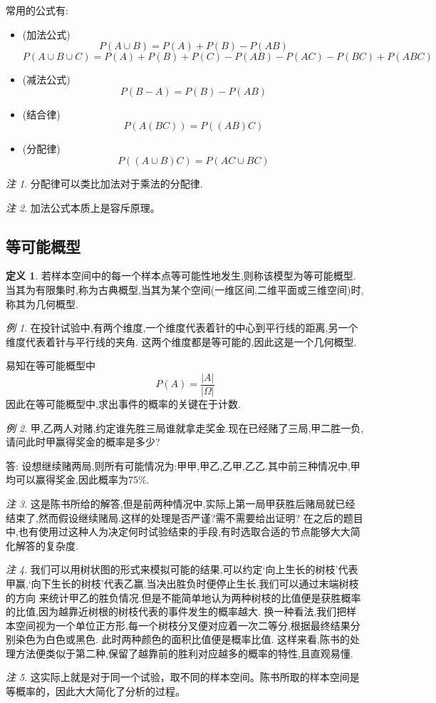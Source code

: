 \documentclass[a4paper,11pt]{article}%
\theoremstyle{remark}
\newtheorem*{remark}{注}
\theoremstyle{remark}
\newtheorem*{example}{例}
\theoremstyle{definition}
\theoremstyle{definition}
\newtheorem*{definition}{定义}
\theoremstyle{plain}
\newcommand*{\abs}[1]{\lvert #1 \rvert}
\begin{document}
常用的公式有:
\begin{itemize}
    \item (加法公式)
    \[P(A\cup B)=P(A)+P(B)-P(AB)\]
    \[P(A\cup B\cup C)=P(A)+P(B)+P(C)-P(AB)-P(AC)-P(BC)+P(ABC)\]
    \item (减法公式)
    \[P(B-A)=P(B)-P(AB)\]
    \item(结合律)
    \[P(A(BC))=P((AB)C)\]
    \item(分配律)
    \[P((A\cup B)C)=P(AC\cup BC)\]
\end{itemize}
\begin{remark}
    分配律可以类比加法对于乘法的分配律.
\end{remark}
\begin{remark}
    加法公式本质上是容斥原理。
\end{remark}
\subsection{等可能概型}
\begin{definition}
    若样本空间中的每一个样本点等可能性地发生,则称该模型为等可能概型.
    当其为有限集时,称为古典概型,当其为某个空间(一维区间,二维平面或三维空间)时,称其为几何概型.
\end{definition}
\begin{example}
    在投针试验中,有两个维度,一个维度代表着针的中心到平行线的距离,另一个维度代表着针与平行线的夹角.
    这两个维度都是等可能的,因此这是一个几何概型.
\end{example}
易知在等可能概型中
\[P(A)=\frac{\abs{A}}{\abs{\Omega}}\]
因此在等可能概型中,求出事件的概率的关键在于计数.
\begin{example}
    甲,乙两人对赌,约定谁先胜三局谁就拿走奖金.现在已经赌了三局,甲二胜一负,请问此时甲赢得奖金的概率是多少?
    
    答:
    设想继续赌两局,则所有可能情况为:甲甲,甲乙,乙甲,乙乙.其中前三种情况中,甲均可以赢得奖金,因此概率为75\%.
    \begin{remark}
        这是陈书所给的解答,但是前两种情况中,实际上第一局甲获胜后赌局就已经结束了,然而假设继续赌局.这样的处理是否严谨?需不需要给出证明?
        在之后的题目中,也有使用过这种人为决定何时试验结束的手段,有时选取合适的节点能够大大简化解答的复杂度.
    \end{remark}
    \begin{remark}
        我们可以用树状图的形式来模拟可能的结果,可以约定`向上生长的树枝'代表甲赢,`向下生长的树枝'代表乙赢.当决出胜负时便停止生长,我们可以通过末端树枝的方向
        来统计甲乙的胜负情况.但是不能简单地认为两种树枝的比值便是获胜概率的比值,因为越靠近树根的树枝代表的事件发生的概率越大.
        换一种看法,我们把样本空间视为一个单位正方形,每一个树枝分叉便对应着一次二等分,根据最终结果分别染色为白色或黑色.
        此时两种颜色的面积比值便是概率比值.
        这样来看,陈书的处理方法便类似于第二种,保留了越靠前的胜利对应越多的概率的特性,且直观易懂.
    \end{remark}
    \begin{remark}
        这实际上就是对于同一个试验，取不同的样本空间。陈书所取的样本空间是等概率的，因此大大简化了分析的过程。
    \end{remark}
\end{example}
\end{document}

